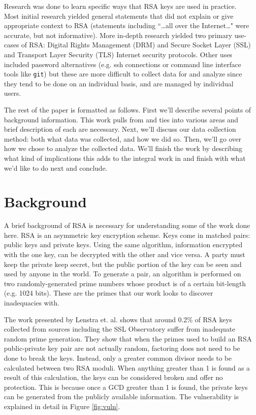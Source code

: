 \documentclass{acm_proc_article-sp}
\begin{document}
Research was done to learn specific ways that RSA keys are used in practice.
Most initial research yielded general statements that did not explain or give
appropriate context to RSA (statements including ``\dots all over the
Internet\dots" were accurate, but not informative). More in-depth research
yielded two primary use-cases of RSA: Digital Rights Management (DRM) and
Secure Socket Layer (SSL) and Transport Layer Security (TLS) Internet
security protocols. Other uses included password alternatives (e.g. ssh
connections or command line interface tools like \texttt{git}) but these are
more difficult to collect data for and analyze since they tend to be done on
an individual basis, and are managed by individual users.

The rest of the paper is formatted as follows. First we'll describe several
points of background information. This work pulls from and ties into various
areas and brief description of each are necessary. Next, we'll discuss our
data collection method: both what data was collected, and how we did so. Then,
we'll go over how we chose to analyze the collected data. We'll finish the work
by describing what kind of implications this adds to the integral work in
\cite{scharfglass2012breaking} and finish with what we'd like to do next and
conclude.

\section{Background}
A brief background of RSA is necessary for understanding some of the work done
here. RSA is an asymmetric key encryption scheme. Keys come in matched pairs:
public keys and private keys. Using the same algorithm, information encrypted
with the one key, can be decrypted with the other and vice versa. A party must
keep the private keep secret, but the public portion of the key can be seen and
used by anyone in the world. To generate a pair, an algorithm is performed on
two randomly-generated prime numbers whose product is of a certain bit-length
(e.g. 1024 bits). These are the primes that our work looks to discover
inadequacies with.

The work presented by Lenstra et. al. \cite{lenstra2012ron} shows that around
0.2\% of RSA keys collected from sources including the SSL Observatory suffer
from inadequate random prime generation. They show that when the primes used to
build an RSA public-private key pair are not actually random, factoring does
not need to be done to break the keys. Instead, only a greater common divisor
needs to be calculated between two RSA moduli. When anything greater than 1 is
found as a result of this calculation, the keys can be considered broken and
offer no protection. This is because once a GCD greater than 1 is found, the
private keys can be generated from the publicly available information. The
vulnerability is explained in detail in Figure \ref{fig:vuln}.
\end{document}
